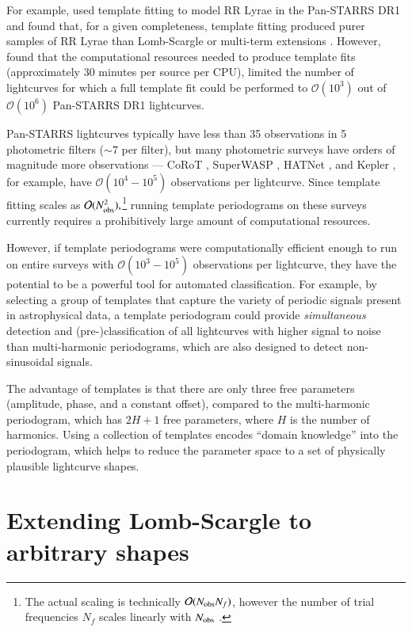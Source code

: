 \documentclass{webofc}
\newcommand{\bigO}{\mathcal{O}}
\begin{document}
For example, \cite{Sesar_etal_2016} used template fitting to model RR Lyrae in the Pan-STARRS DR1 \cite{PanSTARRS} and found that, 
for a given completeness, template fitting produced purer samples of RR Lyrae than Lomb-Scargle or multi-term extensions \cite{Palmer_2009}.
However, \cite{Sesar_etal_2016} found that the computational resources needed to produce template fits 
(approximately 30 minutes per source per CPU), limited the number of lightcurves for which a full template fit could be 
performed to $\bigO(10^3)$ out of $\bigO(10^6)$ Pan-STARRS DR1 lightcurves.

Pan-STARRS lightcurves typically have less than 35 observations in 5 photometric filters ($\sim7$ per filter), but many photometric surveys 
have orders of magnitude more observations --- CoRoT \cite{CoRoT}, SuperWASP \cite{SuperWASP}, HATNet \cite{HATNet}, 
and Kepler \cite{Kepler}, for example, have $\bigO(10^4-10^5)$ observations per lightcurve. Since template fitting scales as 
$\bigO(N_{\rm obs}^2),$\footnote{The actual scaling is technically $\bigO(N_{\rm obs}N_f)$, 
however the number of trial frequencies $N_f$ scales linearly with $N_{\rm obs}$ 
\cite{Vanderplas+Ivezic_2015}.} running template periodograms on these surveys currently requires a prohibitively 
large amount of computational resources. 

However, if template periodograms were computationally efficient enough to run on entire surveys with $\bigO(10^3-10^5)$ observations
per lightcurve, they have the potential to be a powerful tool for automated classification. For example, by selecting a group of templates
that capture the variety of periodic signals present in astrophysical data, a template periodogram could provide \emph{simultaneous} detection
and (pre-)classification of all lightcurves with higher signal to noise than multi-harmonic periodograms, which are also designed to 
detect non-sinusoidal signals. 

The advantage of templates is that there are only three free parameters (amplitude, phase, and a constant offset),
compared to the multi-harmonic periodogram, which has $2H+1$ free parameters, where $H$ is the number of harmonics. Using a collection
of templates encodes ``domain knowledge'' \cite[see, e.g.][]{Yu+Simoff+Jan_2010} into the periodogram, which helps to reduce the parameter space 
to a set of physically plausible lightcurve shapes. 

\section{Extending Lomb-Scargle to arbitrary shapes}\label{sec:formulation}
\end{document}

